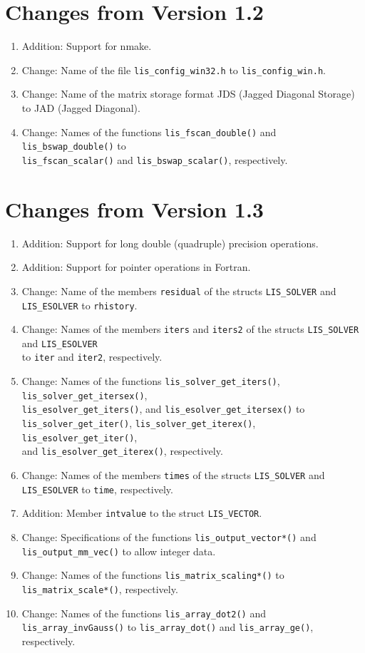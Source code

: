 \documentclass[a4paper]{article}
\begin{document}
\section*{Changes from Version 1.2}
\begin{enumerate}
\item Addition: Support for nmake.
\item Change: Name of the file {\tt lis\_config\_win32.h} to {\tt lis\_config\_win.h}.
\item Change: Name of the matrix storage format JDS (Jagged Diagonal Storage) 
      to JAD (Jagged Diagonal). 
\item Change: Names of the functions 
      {\tt lis\_fscan\_double()} and {\tt lis\_bswap\_double()} to \\
      {\tt lis\_fscan\_scalar()} and 
      {\tt lis\_bswap\_scalar()}, respectively. 
\end{enumerate}

\section*{Changes from Version 1.3}
\begin{enumerate}
\item Addition: Support for long double (quadruple) precision operations.
\item Addition: Support for pointer operations in Fortran.
\item Change: Name of the members 
      {\tt residual} of the structs {\tt LIS\_SOLVER} and {\tt LIS\_ESOLVER} to {\tt rhistory}. 
\item Change: Names of the members 
      {\tt iters} and {\tt iters2} of the structs {\tt LIS\_SOLVER} and {\tt LIS\_ESOLVER} \\
      to {\tt iter} and {\tt iter2}, respectively. 
\item Change: Names of the functions 
      {\tt lis\_solver\_get\_iters()}, {\tt lis\_solver\_get\_itersex()}, \\
      {\tt lis\_esolver\_get\_iters()}, and 
      {\tt lis\_esolver\_get\_itersex()} to \\
      {\tt lis\_solver\_get\_iter()}, {\tt lis\_solver\_get\_iterex()}, 
      {\tt lis\_esolver\_get\_iter()}, \\ 
      and {\tt lis\_esolver\_get\_iterex()}, respectively.
\item Change: Names of the members 
      {\tt *times} of the structs {\tt LIS\_SOLVER} and {\tt LIS\_ESOLVER} to {\tt *time}, respectively.
\item Addition: Member {\tt intvalue} to the struct {\tt LIS\_VECTOR}.
\item Change: Specifications of the functions 
      {\tt lis\_output\_vector*()} and {\tt lis\_output\_mm\_vec()} to allow  
      integer data. 
\item Change: Names of the functions 
      {\tt lis\_matrix\_scaling*()} to {\tt lis\_matrix\_scale*()}, respectively.
\item Change: Names of the functions
      {\tt lis\_array\_dot2()} and {\tt lis\_array\_invGauss()} 
      to {\tt lis\_array\_dot()} and {\tt lis\_array\_ge()}, respectively.
\end{enumerate}
\end{document}
